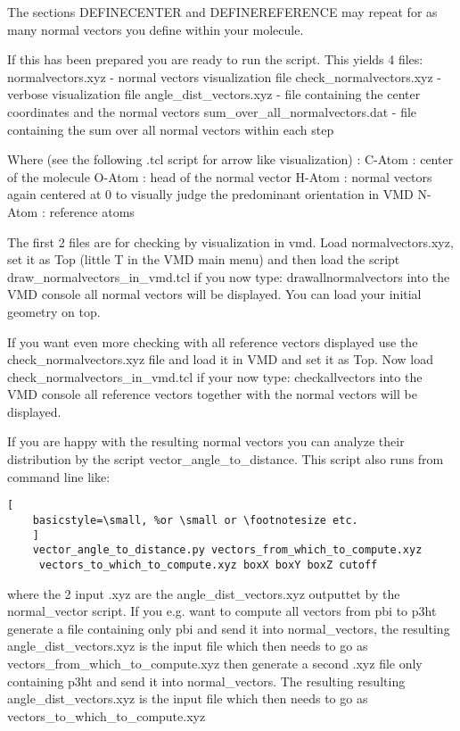 \documentclass{article}
\begin{document}
	The sections DEFINECENTER and DEFINEREFERENCE may repeat for as many normal vectors you define within your molecule.
	
	If this has been prepared you are ready to run the script. This yields 4 files:
	normalvectors.xyz - normal vectors visualization file
	check\_normalvectors.xyz	- verbose visualization file
	angle\_dist\_vectors.xyz - file containing the center coordinates and the normal vectors
	sum\_over\_all\_normalvectors.dat - file containing the sum over all normal vectors within each step
	
	Where (see the following .tcl script for arrow like visualization) :
	C-Atom : center of the molecule
	O-Atom : head of the normal vector
	H-Atom : normal vectors again centered at 0 to visually judge the predominant orientation in VMD
	N-Atom : reference atoms
	
	The first 2 files are for checking by visualization in vmd. Load normalvectors.xyz, set it as Top (little T in the VMD main menu) and then load the script draw\_normalvectors\_in\_vmd.tcl
	if you now type: drawallnormalvectors into the VMD console all normal vectors will be displayed. You can load your initial geometry on top.
	
	If you want even more checking with all reference vectors displayed use the check\_normalvectors.xyz file and load it in VMD and set it as Top. Now load check\_normalvectors\_in\_vmd.tcl
	if your now type: checkallvectors into the VMD console all reference vectors together with the normal vectors will be displayed.
	
	If you are happy with the resulting normal vectors you can analyze their distribution by the script vector\_angle\_to\_distance. This script also runs from command line like:
	
	
	\begin{lstlisting}[
	basicstyle=\small, %or \small or \footnotesize etc.
	]
	vector_angle_to_distance.py vectors_from_which_to_compute.xyz
	 vectors_to_which_to_compute.xyz boxX boxY boxZ cutoff
	\end{lstlisting}
	
	where the 2 input .xyz are the angle\_dist\_vectors.xyz outputtet by the normal\_vector script. If you e.g. want to compute all vectors from pbi to p3ht generate a file containing only pbi and send it into normal\_vectors, the resulting angle\_dist\_vectors.xyz is the input file which then needs to go as vectors\_from\_which\_to\_compute.xyz
	then generate a second .xyz file only containing p3ht and send it into normal\_vectors. The resulting resulting angle\_dist\_vectors.xyz is the input file which then needs to go as vectors\_to\_which\_to\_compute.xyz
	
\end{document}
